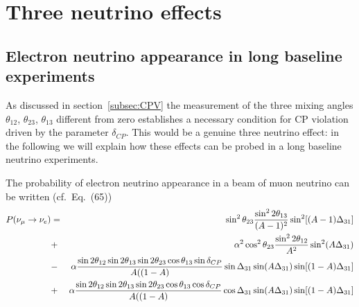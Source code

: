 \section{Three neutrino effects}
\subsection{Electron neutrino appearance in long baseline experiments}
\label{sec:questdelta}

As discussed in section~\ref{subsec:CPV} the measurement of the three mixing angles $\theta_{12}$, $\theta_{23}$, $\theta_{13}$ different from zero establishes a necessary condition for 
CP violation driven by the parameter $\delta_{CP}$.
This would be a genuine three neutrino effect: in the following we will explain how these effects can be probed in a long baseline neutrino experiments.

The probability of electron neutrino appearance in a beam of muon neutrino can be written (cf.~Eq.~(65))
\begin{eqnarray}
P(\nu_{\mu} \rightarrow \nu_e) & = & \sin^2 \theta_{23} \frac{\sin^2 2 \theta_{13}}{(A-1)^2} \sin^2 [(A-1) \Delta_{31}] \nonumber \\
&+& \alpha^2 \cos^2 \theta_{23} \frac{\sin^2 2 \theta_{12}}{A^2} \sin^2 (A\Delta_{31}) \nonumber \\
&-& \alpha \frac{\sin 2 \theta_{12}\sin 2 \theta_{13}\sin 2 \theta_{23}\cos  \theta_{13}\sin  \delta_{CP}}{A ((1-A)} \sin \Delta_{31} \sin (A\Delta_{31})\sin[ (1-A) \Delta_{31}] \nonumber \\
&+& \alpha \frac{\sin 2 \theta_{12}\sin 2 \theta_{13}\sin 2 \theta_{23}\cos  \theta_{13}\cos  \delta_{CP}}{A ((1-A)} \cos \Delta_{31} \sin (A\Delta_{31})\sin[ (1-A) \Delta_{31}]
\label{eq:theta13app}
\end{eqnarray}

